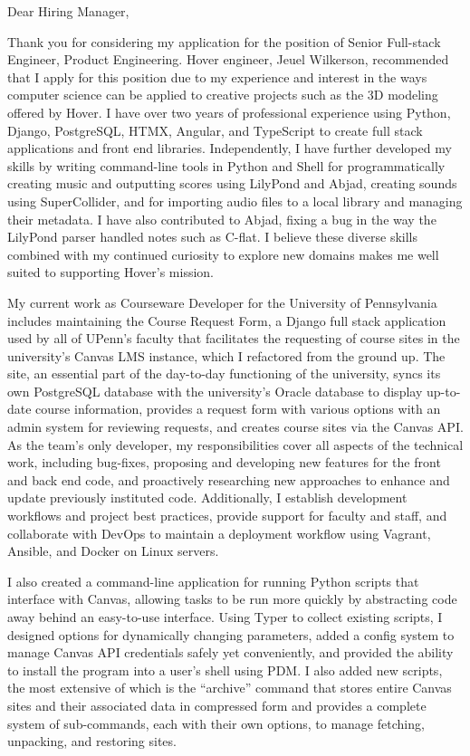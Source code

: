 \header

Dear Hiring Manager,

Thank you for considering my application for the position of Senior Full-stack
Engineer, Product Engineering. Hover engineer, Jeuel Wilkerson, recommended that
I apply for this position due to my experience and interest in the ways computer
science can be applied to creative projects such as the 3D modeling offered by
Hover. I have over two years of professional experience using Python, Django,
PostgreSQL, HTMX, Angular, and TypeScript to create full stack applications and
front end libraries. Independently, I have further developed my skills by
writing command-line tools in Python and Shell for programmatically creating
music and outputting scores using LilyPond and Abjad, creating sounds using
SuperCollider, and for importing audio files to a local library and managing
their metadata. I have also contributed to Abjad, fixing a bug in the way the
LilyPond parser handled notes such as C-flat. I believe these diverse skills
combined with my continued curiosity to explore new domains makes me well suited
to supporting Hover’s mission.

My current work as Courseware Developer for the University of Pennsylvania
includes maintaining the Course Request Form, a Django full stack application
used by all of UPenn’s faculty that facilitates the requesting of course sites
in the university’s Canvas LMS instance, which I refactored from the ground up.
The site, an essential part of the day-to-day functioning of the university,
syncs its own PostgreSQL database with the university’s Oracle database to
display up-to-date course information, provides a request form with various
options with an admin system for reviewing requests, and creates course sites
via the Canvas API. As the team’s only developer, my responsibilities cover all
aspects of the technical work, including bug-fixes, proposing and developing new
features for the front and back end code, and proactively researching new
approaches to enhance and update previously instituted code. Additionally, I
establish development workflows and project best practices, provide support for
faculty and staff, and collaborate with DevOps to maintain a deployment workflow
using Vagrant, Ansible, and Docker on Linux servers.

I also created a command-line application for running Python scripts that
interface with Canvas, allowing tasks to be run more quickly by abstracting code
away behind an easy-to-use interface. Using Typer to collect existing scripts, I
designed options for dynamically changing parameters, added a config system to
manage Canvas API credentials safely yet conveniently, and provided the ability
to install the program into a user’s shell using PDM. I also added new scripts,
the most extensive of which is the “archive” command that stores entire Canvas
sites and their associated data in compressed form and provides a complete
system of sub-commands, each with their own options, to manage fetching,
unpacking, and restoring sites.

